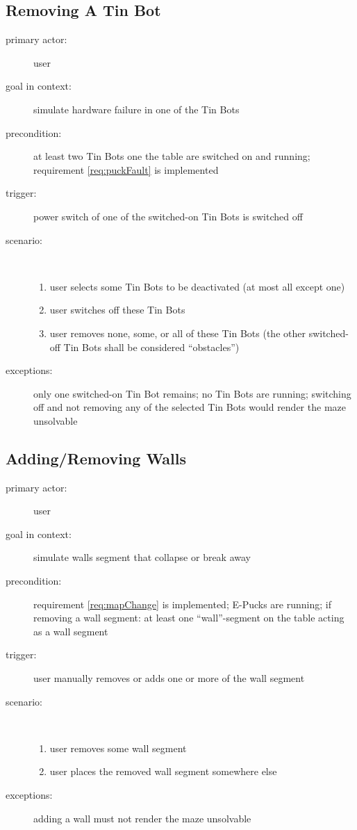 \documentclass[a4paper,parskip,headheight=38pt]{scrartcl} %
\begin{document}
\subsection{Removing A Tin Bot}
\begin{description}
\item[primary actor:] user
\item[goal in context:] simulate hardware failure in one of the Tin Bots
\item[precondition:] at least two Tin Bots one the table are switched on and running; requirement \ref{req:puckFault} is implemented
\item[trigger:] power switch of one of the switched-on Tin Bots is switched off
\item[scenario:] \ 
\begin{enumerate}
	\item user selects some Tin Bots to be deactivated (at most all except one)
	\item user switches off these Tin Bots
	\item user removes none, some, or all of these Tin Bots (the other switched-off Tin Bots shall be considered \enquote{obstacles})
\end{enumerate}
\item[exceptions:] only one switched-on Tin Bot remains; no Tin Bots are running; switching off and not removing any of the selected Tin Bots would render the maze unsolvable
\end{description}

\subsection{Adding/Removing Walls}
\begin{description}
\item[primary actor:] user
\item[goal in context:] simulate walls segment that collapse or break away
\item[precondition:] requirement \ref{req:mapChange} is implemented; E-Pucks are running; if removing a wall segment: at least one \enquote{wall}-segment on the table acting as a wall segment
\item[trigger:] user manually removes or adds one or more of the wall segment
\item[scenario:] \ 
\begin{enumerate}
	\item user removes some wall segment
	\item user places the removed wall segment somewhere else
\end{enumerate}
\item[exceptions:] adding a wall must not render the maze unsolvable
\end{description}
\end{document}
